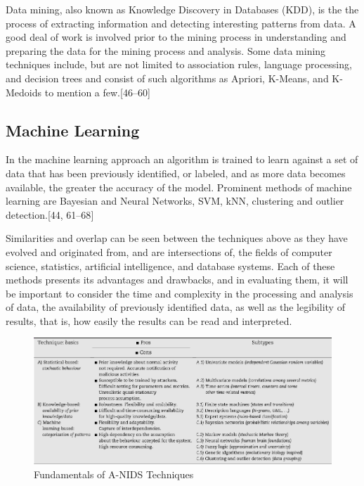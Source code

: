 \documentclass[11pt,a4paper]{article}
\begin{document}
Data mining, also known as Knowledge Discovery in Databases (KDD), is
the the process of extracting information and detecting interesting
patterns from data. A good deal of work is involved prior to the mining
process in understanding and preparing the data for the mining process
and analysis. Some data mining techniques include, but are not limited
to association rules, language processing, and decision trees and
consist of such algorithms as Apriori, K-Means, and K-Medoids to mention
a few.{[}46--60{]}

\subsection{Machine Learning}\label{machine-learning}

In the machine learning approach an algorithm is trained to learn
against a set of data that has been previously identified, or labeled,
and as more data becomes available, the greater the accuracy of the
model. Prominent methods of machine learning are Bayesian and Neural
Networks, SVM, kNN, clustering and outlier detection.{[}44, 61--68{]}

Similarities and overlap can be seen between the techniques above as
they have evolved and originated from, and are intersections of, the
fields of computer science, statistics, artificial intelligence, and
database systems. Each of these methods presents its advantages and
drawbacks, and in evaluating them, it will be important to consider the
time and complexity in the processing and analysis of data, the
availability of previously identified data, as well as the legibility of
results, that is, how easily the results can be read and interpreted.

\begin{figure}

{\centering \includegraphics{thesis_files/figure-latex/unnamed-chunk-11-1} 

}

\caption{Fundamentals of A-NIDS Techniques}\label{fig:unnamed-chunk-11}
\end{figure}
\end{document}
